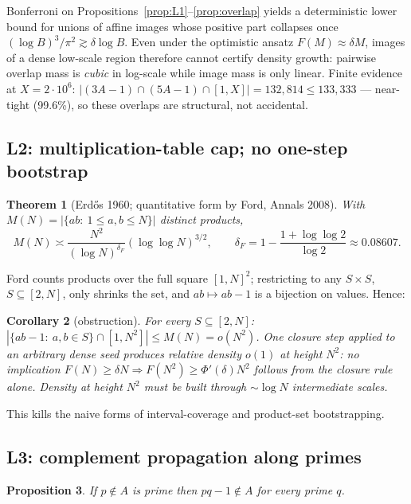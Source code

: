 \documentclass[11pt]{article}
\newtheorem{theorem}{Theorem}
\newtheorem{proposition}[theorem]{Proposition}
\newtheorem{corollary}[theorem]{Corollary}
\theoremstyle{definition}
\newcommand{\A}{A}
\newcommand{\F}{F}
\begin{document}
Bonferroni on Propositions~\ref{prop:L1}--\ref{prop:overlap} yields a
deterministic lower bound for unions of affine images whose positive part
collapses once $(\log B)^3/\pi^2\gtrsim\delta\log B$. Even under the optimistic
ansatz $\F(M)\approx\delta M$, images of a dense low-scale region therefore
cannot certify density growth: pairwise overlap mass is \emph{cubic} in
log-scale while image mass is only linear. Finite evidence at $X=2\cdot10^6$:
$|(3\A{-}1)\cap(5\A{-}1)\cap[1,X]|=132{,}814\le133{,}333$ --- near-tight
(99.6\%), so these overlaps are structural, not accidental.

\subsection{L2: multiplication-table cap; no one-step bootstrap}

\begin{theorem}[Erd\H{o}s 1960; quantitative form by Ford, Annals 2008]
With $M(N)=|\{ab:\ 1\le a,b\le N\}|$ distinct products,
\[
M(N)\asymp\frac{N^2}{(\log N)^{\delta_F}}(\log\log N)^{3/2},
\qquad
\delta_F=1-\frac{1+\log\log 2}{\log 2}\approx0.08607 .
\]
\end{theorem}

Ford counts products over the full square $[1,N]^2$; restricting to any
$S\times S$, $S\subseteq[2,N]$, only shrinks the set, and $ab\mapsto ab-1$ is a
bijection on values. Hence:

\begin{corollary}[obstruction]\label{cor:L2}
For every $S\subseteq[2,N]$:
$|\{ab-1:\ a,b\in S\}\cap[1,N^2]|\le M(N)=o(N^2)$.
One closure step applied to an arbitrary dense seed produces relative density
$o(1)$ at height $N^2$: no implication
$\F(N)\ge\delta N\Rightarrow F(N^2)\ge\Phi'(\delta)N^2$ follows from the
closure rule alone. Density at height $N^2$ must be built through
$\sim\log N$ intermediate scales.
\end{corollary}

This kills the naive forms of interval-coverage and product-set bootstrapping.

\subsection{L3: complement propagation along primes}

\begin{proposition}\label{prop:L3}
If $p\notin\A$ is prime then $pq-1\notin\A$ for every prime $q$.
\end{proposition}
\end{document}
